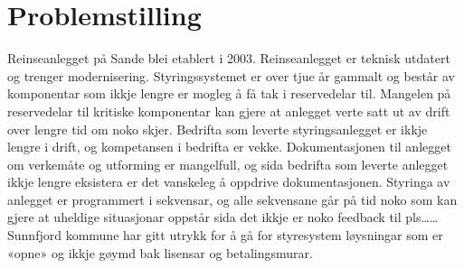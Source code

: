 \section{Problemstilling}
Reinseanlegget på Sande blei etablert i 2003. Reinseanlegget er teknisk utdatert og trenger modernisering. 
Styringssystemet er over tjue år gammalt og består av komponentar som ikkje lengre er mogleg å få tak i reservedelar til. 
Mangelen på reservedelar til kritiske komponentar kan gjere at anlegget verte satt ut av drift over lengre tid om noko skjer. 
Bedrifta som leverte styringsanlegget er ikkje lengre i drift, og kompetansen i bedrifta er vekke. 
Dokumentasjonen til anlegget om verkemåte og utforming er mangelfull, og sida bedrifta som leverte anlegget ikkje lengre eksistera er det vanskeleg å oppdrive dokumentasjonen.
Styringa av anlegget er programmert i sekvensar, og alle sekvensane går på tid noko som kan gjere at uheldige situasjonar oppstår sida det ikkje er noko feedback til pls……
Sunnfjord kommune har gitt utrykk for å gå for styresystem løysningar som er «opne» og ikkje gøymd bak lisensar og betalingsmurar.

